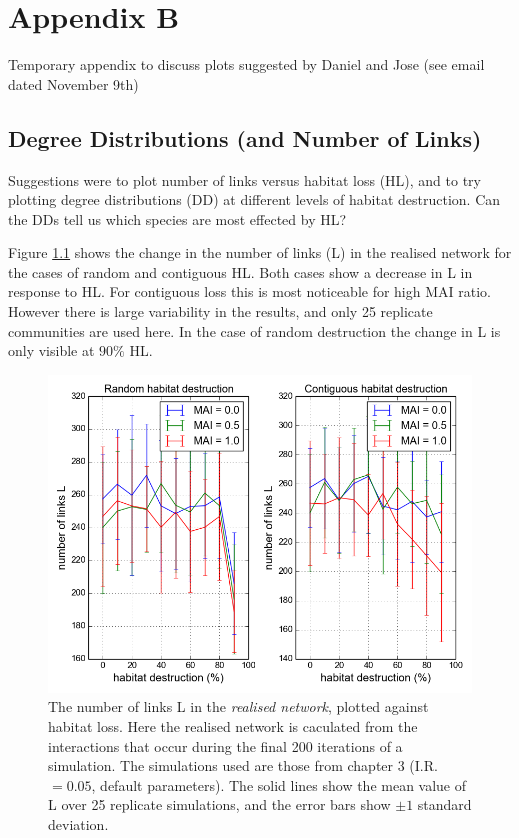 
\chapter{Appendix B}
\label{app:app0b}

Temporary appendix to discuss plots suggested by Daniel and Jose (see email dated November 9th)

\section{Degree Distributions (and Number of Links)}
\label{sec:dd}

Suggestions were to plot number of links versus habitat loss (HL), and to try plotting degree distributions (DD) at different levels of habitat destruction. Can the DDs tell us which species are most effected by HL?

Figure \ref{fig:sdj} shows the change in the number of links (L) in the realised network for the cases of random and contiguous HL. Both cases show a decrease in L in response to HL. For contiguous loss this is most noticeable for high MAI ratio. However there is large variability in the results, and only 25 replicate communities are used here. In the case of random destruction the change in L is only visible at $90\%$ HL.  

\begin{figure}

	\centering
	\includegraphics[width=\textwidth]{"L_v_HL_sdj5000"}
	\caption{The number of links L in the \emph{realised network}, plotted against habitat loss. Here the realised network is caculated from the interactions that occur during the final 200 iterations of a simulation. The simulations used are those from chapter 3 (I.R.$=0.05$, default parameters). The solid lines show the mean value of L over 25 replicate simulations, and the error bars show $\pm 1$ standard deviation.}
	\label{fig:sdj}
\end{figure}

